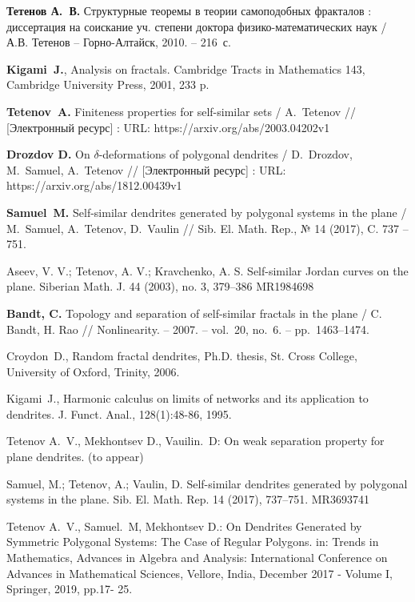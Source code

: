 \begin{thebibliography}{99}
{\bf Тетенов А.~В.} 
Структурные теоремы в теории самоподобных фракталов : диссертация на соискание уч. степени доктора физико-математических наук / А.В. Тетенов -- Горно-Алтайск, 2010. -- 216~с. 

{\bf Kigami~J.}, 
Analysis on fractals. Cambridge Tracts in Mathematics 143, 
Cambridge University Press, 2001, 233 p.

{\bf Tetenov~A.}
Finiteness properties for self-similar sets /
A.~Tetenov //
[Электронный ресурс] : URL: https://arxiv.org/abs/2003.04202v1

{\bf Drozdov D.}
On $\delta$-deformations of polygonal dendrites /
D.~Drozdov, M.~Samuel, A.~Tetenov //
[Электронный ресурс] : URL: https://arxiv.org/abs/1812.00439v1

{\bf Samuel~M.}
 Self-similar dendrites generated by polygonal systems in the plane /
 M.~Samuel, A.~Tetenov, D.~Vaulin // 
Sib. El. Math. Rep., № 14 (2017), C. 737 -- 751. 


 Aseev, V. V.; Tetenov, A. V.; Kravchenko, A. S. Self-similar Jordan curves on
the plane.  Siberian Math. J. 44 (2003), no. 3, 379--386 MR1984698

  {\bf Bandt, C.} Topology and separation of self-similar fractals in the plane / C. Bandt, H. Rao // Nonlinearity. -- 2007. -- vol.~20, no.~6. -- pp.~1463--1474.


 Croydon~D., Random fractal dendrites, Ph.D. thesis, St. Cross College, University of Oxford, Trinity, 2006.


 Kigami~J., Harmonic calculus on limits of networks and its application to dendrites. J. Funct. Anal., 128(1):48-86, 1995.




Tetenov A.~V., Mekhontsev D., Vauilin.~D: On weak separation property for plane dendrites. 	(to appear)

Samuel, M.; Tetenov, A.; Vaulin, D. Self-similar dendrites generated by polygonal systems in the plane. Sib. El. Math. Rep. 14 (2017), 737--751. MR3693741

Tetenov A.~V., Samuel.~M, Mekhontsev D.:
On Dendrites Generated by Symmetric 
Polygonal Systems: The Case of Regular 
Polygons. in:  Trends in Mathematics, Advances in Algebra and Analysis: International Conference on Advances in Mathematical Sciences, Vellore, India, December 2017 - Volume I,  Springer, 2019, pp.17- 25.


\end{thebibliography}
